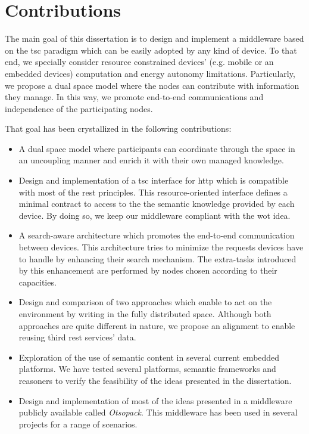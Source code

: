 \section{Contributions}
\label{sec:Contributions}

The main goal of this dissertation is to design and implement a middleware based on the \ac{tsc} paradigm which can be easily adopted by any kind of device.
To that end, we specially consider resource constrained devices' (e.g. mobile or an embedded devices) computation and energy autonomy limitations.
Particularly, we propose a dual space model where the nodes can contribute with information they manage. %
In this way, we promote end-to-end communications and independence of the participating nodes.


That goal has been crystallized in the following contributions:

\begin{itemize} %
  \item A dual space model where participants can coordinate through the space in an uncoupling manner and enrich it with their own managed knowledge.
  \item Design and implementation of a \ac{tsc} interface for \ac{http} which is compatible with most of the \ac{rest} principles.
	This resource-oriented interface defines a minimal contract to access to the the semantic knowledge provided by each device.
	By doing so, we keep our middleware compliant with the \ac{wot} idea. %
  \item A search-aware architecture which promotes the end-to-end communication between devices. %
	This architecture tries to minimize the requests devices have to handle by enhancing their search mechanism.
	The extra-tasks introduced by this enhancement are performed by nodes chosen according to their capacities.
  \item Design and comparison of two approaches which enable to act on the environment by writing in the fully distributed space.
	Although both approaches are quite different in nature, we propose an alignment to enable reusing third \ac{rest} services' data.
  \item Exploration of the use of semantic content in several current embedded platforms.
	We have tested several platforms, semantic frameworks and reasoners to verify the feasibility of the ideas presented in the dissertation.
  \item Design and implementation of most of the ideas presented in a middleware publicly available called \emph{Otsopack}. %
	This middleware has been used in several projects for a range of scenarios.
\end{itemize}